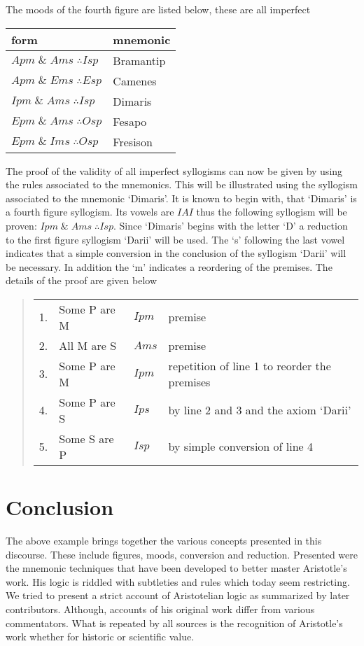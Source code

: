 \documentclass[12pt]{article}
\begin{document}
The moods of the fourth figure are listed below, these are all imperfect
\begin{center}
\begin{tabular}{l l}
\textbf{form} & \textbf{mnemonic}\\
\hline
$Apm \;\&\; Ams\;\therefore Isp$ & Bramantip\\
$Apm \;\&\; Ems\;\therefore Esp$ & Camenes\\
$Ipm \;\&\; Ams\;\therefore Isp$ & Dimaris\\
$Epm \;\&\; Ams\;\therefore Osp$ & Fesapo\\
$Epm \;\&\; Ims\;\therefore Osp$ & Fresison
\end{tabular}
\end{center}
The proof of the validity of all imperfect syllogisms can now be given by using the rules associated to the mnemonics.  This will be illustrated using the syllogism associated to the mnemonic `Dimaris'.  It is known to begin with, that `Dimaris' is a fourth figure syllogism.  Its vowels are $IAI$ thus the following syllogism will be proven: $Ipm \;\&\; Ams\;\therefore Isp$.  Since `Dimaris' begins with the letter `D' a reduction to the first figure syllogism `Darii' will be used.  The `s' following the last vowel indicates that a simple conversion in the conclusion of the syllogism `Darii' will be necessary.  In addition the `m' indicates a reordering of the premises.  The details of the proof are given below
\begin{quote}
\begin{tabular}{l l l l}
1. & Some P are M & $Ipm$ & premise\\
2. & All M are S & $Ams$ & premise\\
3. & Some P are M & $Ipm$ & repetition of line 1 to reorder the premises\\
4. & Some P are S & $Ips$ & by line 2 and 3 and the axiom `Darii'\\
5. & Some S are P & $Isp$ & by simple conversion of line 4
\end{tabular}
\end{quote} 


\section*{Conclusion}
The above example brings together the various concepts presented in this discourse.  These include figures, moods, conversion and reduction.  Presented were the mnemonic techniques that have been developed to better master Aristotle's work.  His logic is riddled with subtleties and rules which today seem restricting.  We tried to present a strict account of Aristotelian logic as summarized by later contributors.  Although, accounts of his original work differ from various commentators.  What is repeated by all sources is the recognition of Aristotle's work whether for historic or scientific value.
\end{document}
